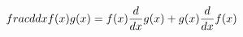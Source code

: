 \documentclass[preview]{standalone}
\begin{document}
\begin{align*}
\special{dvisvgm:raw <g id='unique000'>}\\frac{d}{dx}f(x)g(x)=f(x)\frac{d}{dx}g(x)+g(x)\frac{d}{dx}f(x)\special{dvisvgm:raw </g>}
\end{align*}
\end{document}

